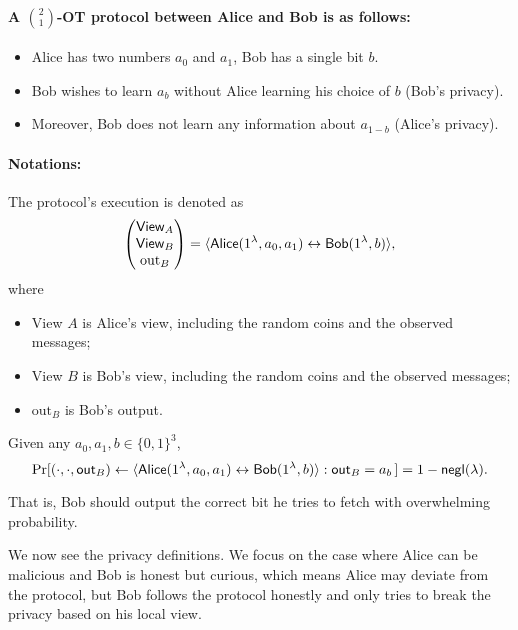 \paragraph{A $\binom{2}{1}$-OT protocol between Alice and Bob is as follows:}
\begin{itemize}
    \item Alice has two numbers $a_0$ and $a_1$, Bob has a single bit $b$.
    \item Bob wishes to learn $a_b$  without Alice learning his choice of $b$ (Bob's privacy).
    \item Moreover, Bob does not learn any information about $a_{1-b}$ (Alice's privacy).
\end{itemize}


\paragraph{Notations:}
The protocol's execution is denoted as 
\[
\begin{pmatrix}
    {\sf View}_{A} \\
    {\sf View}_{B} \\
    \text{out}_{B} 
\end{pmatrix}
=\langle {\sf Alice}(1^\lambda, a_0, a_1) \leftrightarrow {\sf Bob}(1^\lambda, b)\rangle,
\]
where
\begin{itemize}
    \item View $A$ is Alice's view, including the random coins and the observed messages;
    \item View $B$ is Bob's view, including the random coins and the observed messages;
    \item $\text{out}_{B}$ is Bob's output. 
\end{itemize}

\begin{definition}[Correctness of OT]
    Given any $a_0, a_1, b\in \{0,1\}^3$, 
    $$\Pr[(\cdot,\cdot,{\sf out}_B) \leftarrow \langle\textsf{Alice}(1^\lambda, a_0, a_1) \leftrightarrow \textsf{Bob}(1^\lambda, b) \rangle: {\sf out}_B = a_b \,] = 1 - {\sf negl}(\lambda).$$
\end{definition}

That is, Bob should output the correct bit he tries to fetch with overwhelming probability.

We now see the privacy definitions. We focus on the case where Alice can be malicious and Bob is honest but curious, which means Alice may deviate from the protocol, but Bob follows the protocol honestly and only tries to break the privacy based on his local view.

